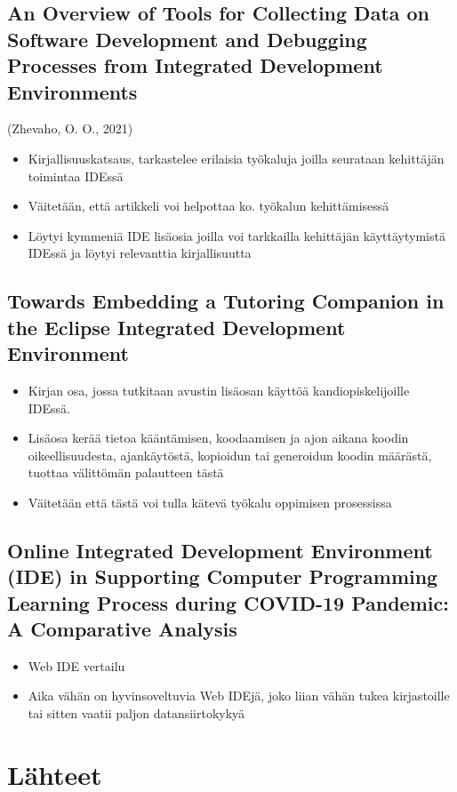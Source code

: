 \documentclass[11pt]{article}
\begin{document}
\subsection{An Overview of Tools for Collecting Data on Software Development and Debugging Processes from Integrated Development Environments}
\label{sec:org1ba6867}
(Zhevaho, O. O., 2021)
\begin{itemize}
\item Kirjallisuuskatsaus, tarkastelee erilaisia työkaluja joilla
seurataan kehittäjän toimintaa IDEssä
\item Väitetään, että artikkeli voi helpottaa ko. työkalun kehittämisessä
\item Löytyi kymmeniä IDE lisäosia joilla voi tarkkailla kehittäjän
käyttäytymistä IDEssä ja löytyi relevanttia kirjallisuutta
\end{itemize}


\subsection{Towards Embedding a Tutoring Companion in the Eclipse Integrated Development Environment}
\begin{itemize}
\item Kirjan osa, jossa tutkitaan avustin lisäosan käyttöä kandiopiskelijoille IDEssä.
\item Lisäosa kerää tietoa kääntämisen, koodaamisen ja ajon aikana koodin oikeellisuudesta, ajankäytöstä, kopioidun tai generoidun koodin määrästä, tuottaa välittömän palautteen tästä
\item Väitetään että tästä voi tulla kätevä työkalu oppimisen prosessissa
\end{itemize}


\subsection{Online Integrated Development Environment (IDE) in Supporting Computer Programming Learning Process during COVID-19 Pandemic: A Comparative Analysis}
\begin{itemize}
\item Web IDE vertailu
\item Aika vähän on hyvinsoveltuvia Web IDEjä, joko liian vähän tukea
  kirjastoille tai sitten vaatii paljon datansiirtokykyä
\end{itemize}


\section{Lähteet}
\label{sec:orgb7e844c}
\end{document}
